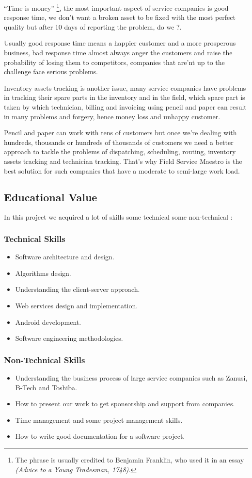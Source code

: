 ``Time is money'' \footnote{The phrase is usually credited to Benjamin Franklin, who used it in an essay \textit{(Advice to a Young Tradesman, 1748).}}, the most important aspect of service companies is good response time, we don't want a broken asset to be fixed with the most perfect quality but after 10 days of reporting the problem, do we ?. 

Usually good response time means a happier customer and a more prosperous business, bad response time almost always anger the customers and raise the probability of losing them to competitors, companies that are'nt up to the challenge face serious problems.

Inventory assets tracking is another issue, many service companies have problems in tracking their spare parts in the inventory and in the field, which spare part is taken by which technician, billing and invoicing using pencil and paper can result in many problems and forgery, hence money loss and unhappy customer.

Pencil and paper can work with tens of customers but once we're dealing with hundreds, thousands or hundreds of thousands of customers we need a better approach to tackle the problems of dispatching, scheduling, routing, inventory assets tracking and technician tracking. That's why Field Service Maestro is the best solution for such companies that have a moderate to semi-large work load.

\subsection{Educational Value}
	In this project we acquired a lot of skills some technical some non-technical :
	\subsubsection{Technical Skills} 
		\begin{itemize}
			\item Software architecture and design.
			\item Algorithms design.
			\item Understanding the client-server approach.
			\item Web services design and implementation.
			\item Android development.
			\item Software engineering methodologies.
		\end{itemize} 
	\subsubsection{Non-Technical Skills}
		\begin{itemize}
			\item Understanding the business process of large service companies such as Zanusi, B-Tech and Toshiba.
			\item How to present our work to get sponsorship and support from companies.
			\item Time management and some project management skills.
			\item How to write good documentation for a software project.
		\end{itemize}